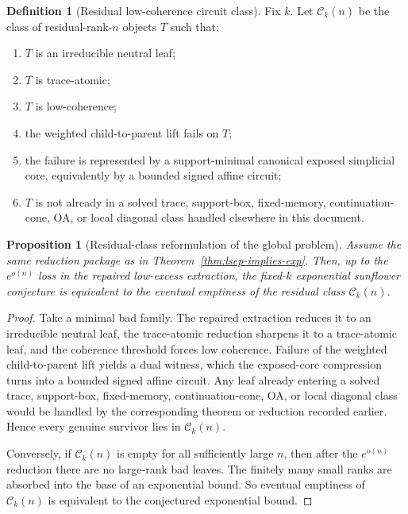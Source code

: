 \documentclass[11pt]{article}
\newtheorem{proposition}[theorem]{Proposition}
\theoremstyle{definition}
\newtheorem{definition}[theorem]{Definition}
\newcommand{\1}{\mathbf{1}}
\begin{document}
\begin{definition}[Residual low-coherence circuit class]\label{def:residual-class}
Fix $k$. Let $\mathcal C_k(n)$ be the class of residual-rank-$n$ objects $T$ such that:
\begin{enumerate}[label=(\roman*),leftmargin=2.2em]
\item $T$ is an irreducible neutral leaf;
\item $T$ is trace-atomic;
\item $T$ is low-coherence;
\item the weighted child-to-parent lift fails on $T$;
\item the failure is represented by a support-minimal canonical exposed simplicial core, equivalently by a bounded signed affine circuit;
\item $T$ is not already in a solved trace, support-box, fixed-memory, continuation-cone, OA, or local diagonal class handled elsewhere in this document.
\end{enumerate}
\end{definition}

\begin{proposition}[Residual-class reformulation of the global problem]\label{prop:residual-class-equivalence}
Assume the same reduction package as in Theorem~\ref{thm:lsep-implies-exp}. Then, up to the $e^{o(n)}$ loss in the repaired low-excess extraction, the fixed-$k$ exponential sunflower conjecture is equivalent to the eventual emptiness of the residual class $\mathcal C_k(n)$.
\end{proposition}

\begin{proof}
Take a minimal bad family. The repaired extraction reduces it to an irreducible neutral leaf, the trace-atomic reduction sharpens it to a trace-atomic leaf, and the coherence threshold forces low coherence. Failure of the weighted child-to-parent lift yields a dual witness, which the exposed-core compression turns into a bounded signed affine circuit. Any leaf already entering a solved trace, support-box, fixed-memory, continuation-cone, OA, or local diagonal class would be handled by the corresponding theorem or reduction recorded earlier. Hence every genuine survivor lies in $\mathcal C_k(n)$.

Conversely, if $\mathcal C_k(n)$ is empty for all sufficiently large $n$, then after the $e^{o(n)}$ reduction there are no large-rank bad leaves. The finitely many small ranks are absorbed into the base of an exponential bound. So eventual emptiness of $\mathcal C_k(n)$ is equivalent to the conjectured exponential bound.
\end{proof}
\end{document}
